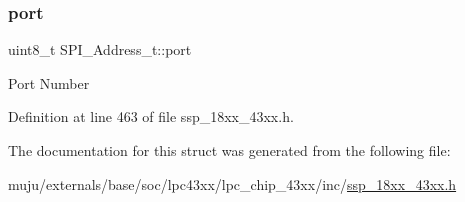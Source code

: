 \subsubsection{\texorpdfstring{port}{port}}
{\footnotesize\ttfamily uint8\+\_\+t S\+P\+I\+\_\+\+Address\+\_\+t\+::port}

Port Number 

Definition at line 463 of file ssp\+\_\+18xx\+\_\+43xx.\+h.



The documentation for this struct was generated from the following file\+:\begin{DoxyCompactItemize}
\item 
muju/externals/base/soc/lpc43xx/lpc\+\_\+chip\+\_\+43xx/inc/\hyperlink{ssp__18xx__43xx_8h}{ssp\+\_\+18xx\+\_\+43xx.\+h}\end{DoxyCompactItemize}
